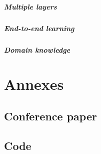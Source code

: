 \documentclass[a4paper,12pt,twoside]{report}
\begin{document}
\paragraph{Multiple layers}

\paragraph{End-to-end learning}

\paragraph{Domain knowledge}

\printbibliography
{}

\chapter*{Annexes}
\label{annexes}

\section*{Conference paper}

\section*{Code}
\end{document}
